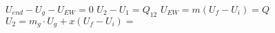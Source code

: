\( U_{end} - U_{g} - U_{EW} = 0 \)  
\( U_2 - U_1 = Q_{12} \)  
\( U_{EW} = m(U_f - U_i) = Q \)  
\( U_2 = m_{g} \cdot U_g + x(U_f - U_i) = \)